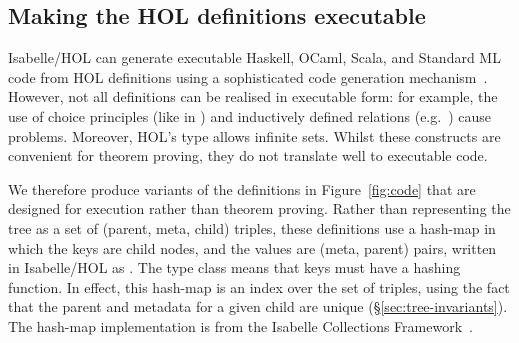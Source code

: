 \documentclass[10pt,journal,compsoc]{IEEEtran}
\begin{document}
\subsection{Making the HOL definitions executable} \label{subsect.extracting}

Isabelle/HOL can generate executable Haskell, OCaml, Scala, and Standard ML code from HOL definitions using a sophisticated code generation mechanism~\cite{DBLP:conf/flops/HaftmannN10}.
However, not all definitions can be realised in executable form: for example, the use of choice principles (like in ) and inductively defined relations (e.g.\ ) cause problems.
Moreover, HOL's  type allows infinite sets.
Whilst these constructs are convenient for theorem proving, they do not translate well to executable code.

We therefore produce variants of the definitions in Figure~\ref{fig:code} that are designed for execution rather than theorem proving.
Rather than representing the tree as a set of (parent, meta, child) triples, these definitions use a hash-map in which the keys are child nodes, and the values are (meta, parent) pairs, written in Isabelle/HOL as .
The  type class means that keys must have a hashing function.
In effect, this hash-map is an index over the set of triples, using the fact that the parent and metadata for a given child are unique (\S\ref{sec:tree-invariants}).
The hash-map implementation is from the Isabelle Collections Framework~\cite{DBLP:conf/itp/LammichL10}.
\end{document}
